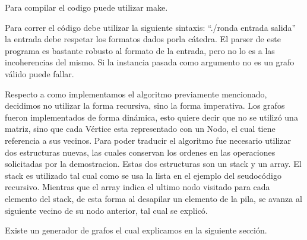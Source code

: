 Para compilar el codigo puede utilizar make.

Para correr el código debe utilizar la siguiente sintaxis: ``./ronda entrada salida'' la entrada debe respetar los formatos dados porla cátedra. El parser de este programa es bastante robusto al formato de la entrada, pero no lo es a las incoherencias del mismo. Si la instancia pasada como argumento no es un grafo válido puede fallar.

Respecto a como implementamos el algoritmo previamente mencionado, decidimos no utilizar la forma recursiva, sino la forma imperativa. Los grafos fueron implementados de forma dinámica, esto quiere decir que no se utilizó una matriz, sino que cada Vértice esta representado con un Nodo, el cual tiene referencia a sus vecinos. Para poder traducir el algoritmo fue necesario utilizar dos estructuras nuevas, las cuales conservan los ordenes en las operaciones solicitadas por la demostracion. Estas dos estructuras son un stack y un array. El stack es utilizado tal cual como se usa la lista en el ejemplo del seudocódigo recursivo. Mientras que el array indica el ultimo nodo visitado para cada elemento del stack, de esta forma al desapilar un elemento de la pila, se avanza al siguiente vecino de su nodo anterior, tal cual se explicó.

Existe un generador de grafos el cual explicamos en la siguiente sección.
